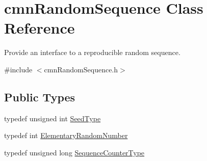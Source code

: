 \hypertarget{classcmn_random_sequence}{}\section{cmn\+Random\+Sequence Class Reference}
\label{classcmn_random_sequence}


Provide an interface to a reproducible random sequence.  




{\ttfamily \#include $<$cmn\+Random\+Sequence.\+h$>$}

\subsection*{Public Types}
\begin{DoxyCompactItemize}
\item 
typedef unsigned int \hyperlink{classcmn_random_sequence_a7b97009536ce38559fa5fb86a9eea16d}{Seed\+Type}
\item 
typedef int \hyperlink{classcmn_random_sequence_a4728645d25009df6b70fd0db6340f92f}{Elementary\+Random\+Number}
\item 
typedef unsigned long \hyperlink{classcmn_random_sequence_ac3befd667513146020ef266429e205b0}{Sequence\+Counter\+Type}
\end{DoxyCompactItemize}
